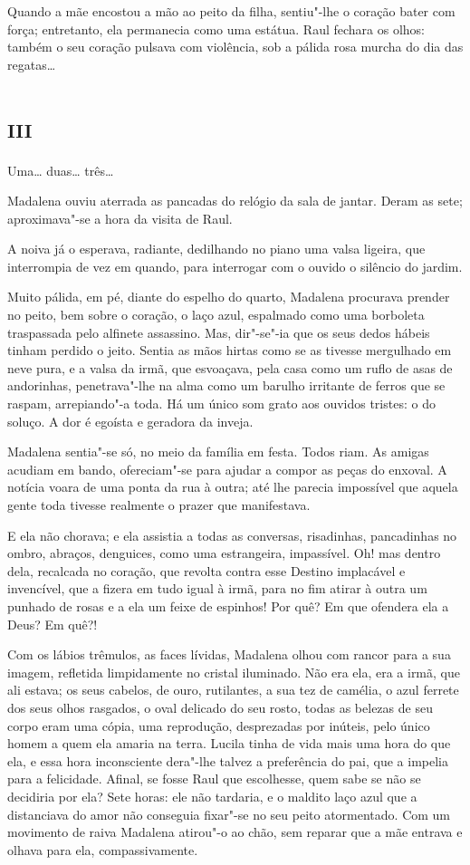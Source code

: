 Quando a mãe encostou a mão ao peito da filha, sentiu"-lhe o coração
bater com força; entretanto, ela permanecia como uma estátua. Raul
fechara os olhos: também o seu coração pulsava com violência, sob a
pálida rosa murcha do dia das regatas\ldots{}

\section{\textsc{iii}}

Uma\ldots{} duas\ldots{} três\ldots{}

Madalena ouviu aterrada as pancadas do relógio da sala de jantar. Deram
as sete; aproximava"-se a hora da visita de Raul.

A noiva já o esperava, radiante, dedilhando no piano uma valsa ligeira,
que interrompia de vez em quando, para interrogar com o ouvido o
silêncio do jardim.

Muito pálida, em pé, diante do espelho do quarto, Madalena procurava
prender no peito, bem sobre o coração, o laço azul, espalmado como uma
borboleta traspassada pelo alfinete assassino. Mas, dir"-se"-ia que os
seus dedos hábeis tinham perdido o jeito. Sentia as mãos hirtas como se
as tivesse mergulhado em neve pura, e a valsa da irmã, que esvoaçava,
pela casa como um ruflo de asas de andorinhas, penetrava"-lhe na alma
como um barulho irritante de ferros que se raspam, arrepiando"-a toda. Há
um único som grato aos ouvidos tristes: o do soluço. A dor é egoísta e
geradora da inveja.

Madalena sentia"-se só, no meio da família em festa. Todos riam. As
amigas acudiam em bando, ofereciam"-se para ajudar a compor as peças do
enxoval. A notícia voara de uma ponta da rua à outra; até lhe parecia
impossível que aquela gente toda tivesse realmente o prazer que
manifestava.

E ela não chorava; e ela assistia a todas as conversas, risadinhas,
pancadinhas no ombro, abraços, denguices, como uma estrangeira,
impassível. Oh! mas dentro dela, recalcada no coração, que revolta
contra esse Destino implacável e invencível, que a fizera em tudo igual
à irmã, para no fim atirar à outra um punhado de rosas e a ela um feixe
de espinhos! Por quê? Em que ofendera ela a Deus? Em quê?!

Com os lábios trêmulos, as faces lívidas, Madalena olhou com rancor para
a sua imagem, refletida limpidamente no cristal iluminado. Não era ela,
era a irmã, que ali estava; os seus cabelos, de ouro, rutilantes, a sua
tez de camélia, o azul ferrete dos seus olhos rasgados, o oval delicado
do seu rosto, todas as belezas de seu corpo eram uma cópia, uma
reprodução, desprezadas por inúteis, pelo único homem a quem ela amaria
na terra. Lucila tinha de vida mais uma hora do que ela, e essa hora
inconsciente dera"-lhe talvez a preferência do pai, que a impelia para a
felicidade. Afinal, se fosse Raul que escolhesse, quem sabe se não se
decidiria por ela? Sete horas: ele não tardaria, e o maldito laço azul
que a distanciava do amor não conseguia fixar"-se no seu peito
atormentado. Com um movimento de raiva Madalena atirou"-o ao chão, sem
reparar que a mãe entrava e olhava para ela, compassivamente.


